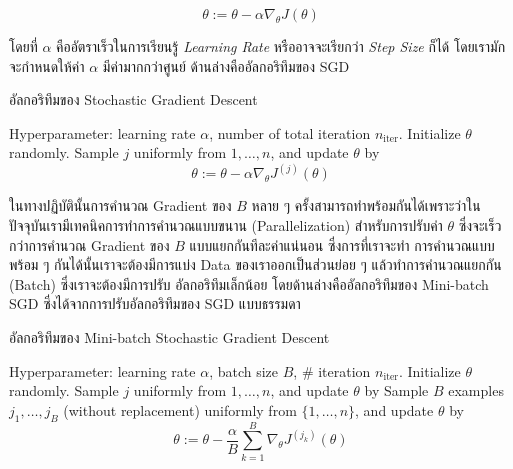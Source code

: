 \begin{equation}
    \theta := \theta - \alpha\nabla_\theta J(\theta)
\end{equation}

\noindent โดยที่ $\alpha$ คืออัตราเร็วในการเรียนรู้ \textit{Learning Rate} หรืออาจจะเรียกว่า \textit{Step Size} ก็ได้ 
โดยเรามักจะกำหนดให้ค่า $\alpha$ มีค่ามากกว่าศูนย์ ด้านล่างคืออัลกอริทึมของ SGD

\begin{algorithm}[ht]
    \caption{อัลกอริทึมของ Stochastic Gradient Descent}
    \label{alg:sgd_dl}
    \begin{algorithmic}
    \State Hyperparameter: learning rate $\alpha$, number of total iteration $n_\text{iter}$.
    \State Initialize $\theta$ randomly.
        \State Sample $j$ uniformly from ${1,\ldots,n}$, and update $\theta$ by
        \begin{equation*}
            \theta := \theta - \alpha\nabla_\theta J^{(j)}(\theta)
        \end{equation*}
    \EndFor
    \end{algorithmic}
\end{algorithm}

ในทางปฏิบัตินั้นการคำนวณ Gradient ของ $B$ หลาย ๆ ครั้งสามารถทำพร้อมกันได้เพราะว่าในปัจจุบันเรามีเทคนิคการทำการคำนวณแบบขนาน 
(Parallelization) สำหรับการปรับค่า $\theta$ ซึ่งจะเร็วกว่าการคำนวณ Gradient ของ $B$ แบบแยกกันทีละค่าแน่นอน ซึ่งการที่เราจะทำ%
การคำนวณแบบพร้อม ๆ กันได้นั้นเราจะต้องมีการแบ่ง Data ของเราออกเป็นส่วนย่อย ๆ แล้วทำการคำนวณแยกกัน (Batch) ซึ่งเราจะต้องมีการปรับ%
อัลกอริทึมเล็กน้อย โดยด้านล่างคืออัลกอริทึมของ Mini-batch SGD ซึ่งได้จากการปรับอัลกอริทึมของ SGD แบบธรรมดา  

\begin{algorithm}[ht]
    \caption{อัลกอริทึมของ Mini-batch Stochastic Gradient Descent}
    \label{alg:sgd_minibatch}
    \begin{algorithmic}
    \State Hyperparameter: learning rate $\alpha$, batch size $B$, \# iteration $n_\text{iter}$.
    \State Initialize $\theta$ randomly.
        \State Sample $j$ uniformly from ${1,\ldots,n}$, and update $\theta$ by
        \State Sample $B$ examples $j_1,\ldots,j_B$ (without replacement) uniformly from $\{1,\ldots,n\}$, 
        and update $\theta$ by
        \begin{equation*}
            \theta := \theta - \frac{\alpha}{B}\sum_{k=1}^B\nabla_\theta J^{(j_k)}(\theta)
        \end{equation*}
    \EndFor
    \end{algorithmic}
\end{algorithm}

